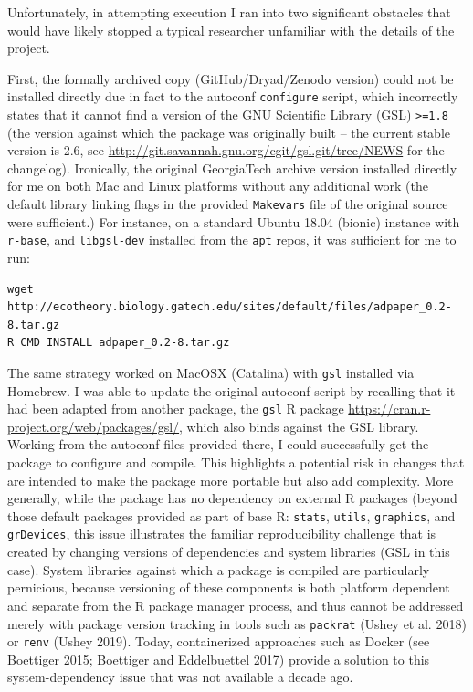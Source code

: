 \documentclass[
]{rescience}
\begin{document}
Unfortunately, in attempting execution I ran into two significant
obstacles that would have likely stopped a typical researcher unfamiliar
with the details of the project.

First, the formally archived copy (GitHub/Dryad/Zenodo version) could
not be installed directly due in fact to the autoconf \texttt{configure}
script, which incorrectly states that it cannot find a version of the
GNU Scientific Library (GSL) \texttt{\textgreater{}=1.8} (the version
against which the package was originally built -- the current stable
version is 2.6, see
\url{http://git.savannah.gnu.org/cgit/gsl.git/tree/NEWS} for the
changelog). Ironically, the original GeorgiaTech archive version
installed directly for me on both Mac and Linux platforms without any
additional work (the default library linking flags in the provided
\texttt{Makevars} file of the original source were sufficient.) For
instance, on a standard Ubuntu 18.04 (bionic) instance with
\texttt{r-base}, and \texttt{libgsl-dev} installed from the \texttt{apt}
repos, it was sufficient for me to run:

\begin{verbatim}
wget http://ecotheory.biology.gatech.edu/sites/default/files/adpaper_0.2-8.tar.gz
R CMD INSTALL adpaper_0.2-8.tar.gz
\end{verbatim}

The same strategy worked on MacOSX (Catalina) with \texttt{gsl}
installed via Homebrew. I was able to update the original autoconf
script by recalling that it had been adapted from another package, the
\texttt{gsl} R package
\url{https://cran.r-project.org/web/packages/gsl/}, which also binds
against the GSL library. Working from the autoconf files provided there,
I could successfully get the package to configure and compile. This
highlights a potential risk in changes that are intended to make the
package more portable but also add complexity. More generally, while the
package has no dependency on external R packages (beyond those default
packages provided as part of base R: \texttt{stats}, \texttt{utils},
\texttt{graphics}, and \texttt{grDevices}, this issue illustrates the
familiar reproducibility challenge that is created by changing versions
of dependencies and system libraries (GSL in this case). System
libraries against which a package is compiled are particularly
pernicious, because versioning of these components is both platform
dependent and separate from the R package manager process, and thus
cannot be addressed merely with package version tracking in tools such
as \texttt{packrat} (Ushey et al. 2018) or \texttt{renv} (Ushey 2019).
Today, containerized approaches such as Docker (see Boettiger 2015;
Boettiger and Eddelbuettel 2017) provide a solution to this
system-dependency issue that was not available a decade ago.
\end{document}
